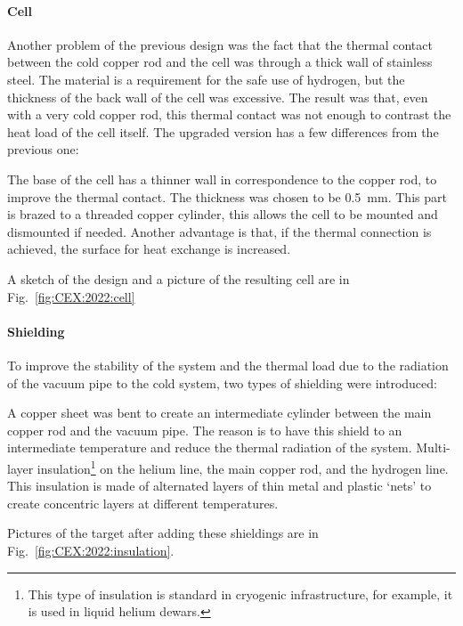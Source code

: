 \begin{refsection}
        \paragraph{Cell} Another problem of the previous design was the fact that the thermal contact between the cold copper rod and the cell was through a thick wall of stainless steel. 
        The material is a requirement for the safe use of hydrogen, but the thickness of the back wall of the cell was excessive.
        The result was that, even with a very cold copper rod, this thermal contact was not enough to contrast the heat load of the cell itself.
        The upgraded version has a few differences from the previous one:
        \begin{outline}
            \1 The base of the cell has a thinner wall in correspondence to the copper rod, to improve the thermal contact. The thickness was chosen to be \SI{0.5}{mm}.
            \1 This part is brazed to a threaded copper cylinder, this allows the cell to be mounted and dismounted if needed. 
            Another advantage is that, if the thermal connection is achieved, the surface for heat exchange is increased.
        \end{outline}
        A sketch of the design and a picture of the resulting cell are in Fig.~\ref{fig:CEX:2022:cell}
        
        \paragraph{Shielding} To improve the stability of the system and the thermal load due to the radiation of the vacuum pipe to the cold system, two types of shielding were introduced:
        \begin{outline}
            \1 A copper sheet was bent to create an intermediate cylinder between the main copper rod and the vacuum pipe. The reason is to have this shield to an intermediate temperature and reduce the thermal radiation of the system. 
            \1 Multi-layer insulation\footnote{This type of insulation is standard in cryogenic infrastructure, for example, it is used in liquid helium dewars.} on the helium line, the main copper rod, and the hydrogen line. This insulation is made of alternated layers of thin metal and plastic `nets' to create concentric layers at different temperatures. 
        \end{outline}
        Pictures of the target after adding these shieldings are in Fig.~\ref{fig:CEX:2022:insulation}. 


\end{refsection}
